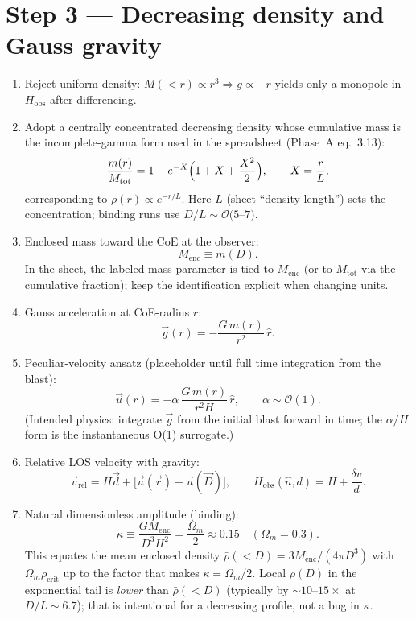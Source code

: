 \documentclass[11pt,a4paper]{article}
\begin{document}
\section{Step 3 --- Decreasing density and Gauss gravity}

\begin{enumerate}[leftmargin=*]
\item Reject uniform density: \(M(<r)\propto r^3\Rightarrow g\propto -r\) yields only a monopole in \(H_{\mathrm{obs}}\) after differencing.
\item Adopt a centrally concentrated decreasing density whose cumulative mass is the incomplete-gamma form used in the spreadsheet (Phase~A eq.~3.13):
\[
\frac{m(r)}{M_{\mathrm{tot}}}
=1-e^{-X}\Bigl(1+X+\frac{X^2}{2}\Bigr),
\qquad X=\frac{r}{L},
\]
corresponding to \(\rho(r)\propto e^{-r/L}\). Here \(L\) (sheet ``density length'') sets the concentration; binding runs use \(D/L\sim\mathcal{O}(5\)--\(7)\).
\item Enclosed mass toward the CoE at the observer:
\[
M_{\mathrm{enc}}\equiv m(D).
\]
In the sheet, the labeled mass parameter is tied to \(M_{\mathrm{enc}}\) (or to \(M_{\mathrm{tot}}\) via the cumulative fraction); keep the identification explicit when changing units.
\item Gauss acceleration at CoE-radius \(r\):
\[
\vec{g}(r)=-\frac{G\,m(r)}{r^2}\,\hat{r}.
\]
\item Peculiar-velocity ansatz (placeholder until full time integration from the blast):
\[
\vec{u}(r)=-\alpha\,\frac{G\,m(r)}{r^2 H}\,\hat{r},
\qquad \alpha\sim\mathcal{O}(1).
\]
(Intended physics: integrate \(\vec{g}\) from the initial blast forward in time; the \(\alpha/H\) form is the instantaneous O(1) surrogate.)
\item Relative LOS velocity with gravity:
\[
\vec{v}_{\mathrm{rel}}=H\vec{d}+\bigl[\vec{u}(\vec{r})-\vec{u}(\vec{D})\bigr],
\qquad
H_{\mathrm{obs}}(\hat{n},d)=H+\frac{\delta v}{d}.
\]
\item Natural dimensionless amplitude (binding):
\[
\kappa\equiv\frac{G M_{\mathrm{enc}}}{D^3 H^2}
=\frac{\Omega_m}{2}\approx 0.15
\quad(\Omega_m=0.3).
\]
This equates the mean enclosed density \(\bar\rho(<D)=3M_{\mathrm{enc}}/(4\pi D^3)\) with \(\Omega_m\rho_{\mathrm{crit}}\) up to the factor that makes \(\kappa=\Omega_m/2\). Local \(\rho(D)\) in the exponential tail is \emph{lower} than \(\bar\rho(<D)\) (typically by \(\sim 10\)--\(15\times\) at \(D/L\sim 6.7\)); that is intentional for a decreasing profile, not a bug in \(\kappa\).
\end{enumerate}
\end{document}
